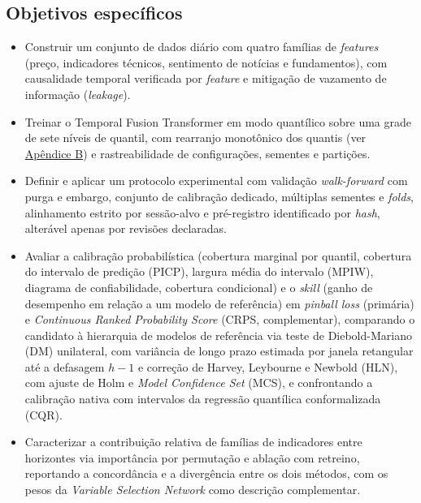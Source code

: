 \subsection{Objetivos específicos} \label{sec:objetivos-especificos}
\begin{itemize}
    \item Construir um conjunto de dados diário com quatro famílias de \textit{features} (preço, indicadores técnicos, sentimento de notícias e fundamentos), com causalidade temporal verificada por \textit{feature} e mitigação de vazamento de informação (\textit{leakage}).
    \item Treinar o Temporal Fusion Transformer em modo quantílico sobre uma grade de sete níveis de quantil, com rearranjo monotônico dos quantis (ver \hyperref[gl:rearranjo]{Apêndice B}) e rastreabilidade de configurações, sementes e partições.
    \item Definir e aplicar um protocolo experimental com validação \textit{walk-forward} com purga e embargo, conjunto de calibração dedicado, múltiplas sementes e \textit{folds}, alinhamento estrito por sessão-alvo e pré-registro identificado por \textit{hash}, alterável apenas por revisões declaradas.
    \item Avaliar a calibração probabilística (cobertura marginal por quantil, cobertura do intervalo de predição (PICP), largura média do intervalo (MPIW), diagrama de confiabilidade, cobertura condicional) e o \textit{skill} (ganho de desempenho em relação a um modelo de referência) em \textit{pinball loss} (primária) e \textit{Continuous Ranked Probability Score} (CRPS, complementar), comparando o candidato à hierarquia de modelos de referência via teste de Diebold-Mariano (DM) unilateral, com variância de longo prazo estimada por janela retangular até a defasagem \(h-1\) e correção de Harvey, Leybourne e Newbold (HLN), com ajuste de Holm e \textit{Model Confidence Set} (MCS), e confrontando a calibração nativa com intervalos da regressão quantílica conformalizada (CQR).
    \item Caracterizar a contribuição relativa de famílias de indicadores entre horizontes via importância por permutação e ablação com retreino, reportando a concordância e a divergência entre os dois métodos, com os pesos da \textit{Variable Selection Network} como descrição complementar.
\end{itemize}

